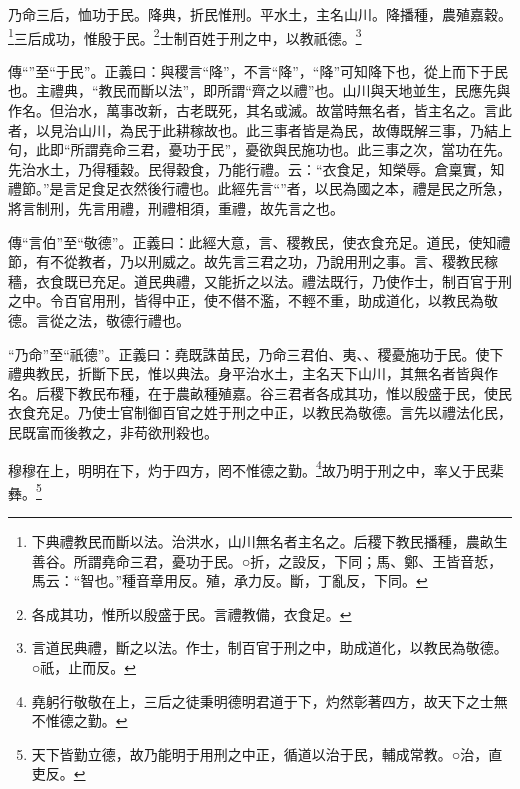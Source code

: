 乃命三后，恤功于民。降典，折民惟刑。平水土，主名山川。降播種，農殖嘉穀。\footnote{下典禮教民而斷以法。治洪水，山川無名者主名之。后稷下教民播種，農畝生善谷。所謂堯命三君，憂功于民。○折，之設反，下同；馬、鄭、王皆音悊，馬云：“智也。”種音章用反。殖，承力反。斷，丁亂反，下同。}三后成功，惟殷于民。\footnote{各成其功，惟所以殷盛于民。言禮教備，衣食足。}士制百姓于刑之中，以教祇德。\footnote{言道民典禮，斷之以法。作士，制百官于刑之中，助成道化，以教民為敬德。○祇，止而反。}


{\noindent\zhuan{}\fzbyks 傳“”至“于民”。正義曰：與稷言“降”，不言“降”，“降”可知降下也，從上而下于民也。主禮典，“教民而斷以法”，即所謂“齊之以禮”也。山川與天地並生，民應先與作名。但治水，萬事改新，古老既死，其名或滅。故當時無名者，皆主名之。言此者，以見治山川，為民于此耕稼故也。此三事者皆是為民，故傳既解三事，乃結上句，此即“所謂堯命三君，憂功于民”，憂欲與民施功也。此三事之次，當功在先。先治水土，乃得種穀。民得穀食，乃能行禮。云：“衣食足，知榮辱。倉稟實，知禮節。”是言足食足衣然後行禮也。此經先言“”者，以民為國之本，禮是民之所急，將言制刑，先言用禮，刑禮相須，重禮，故先言之也。 \par}

{\noindent\zhuan{}\fzbyks 傳“言伯”至“敬德”。正義曰：此經大意，言、稷教民，使衣食充足。道民，使知禮節，有不從教者，乃以刑威之。故先言三君之功，乃說用刑之事。言、稷教民稼穡，衣食既已充足。道民典禮，又能折之以法。禮法既行，乃使作士，制百官于刑之中。令百官用刑，皆得中正，使不僣不濫，不輕不重，助成道化，以教民為敬德。言從之法，敬德行禮也。 \par}

{\noindent\shu{}\fzkt “乃命”至“祇德”。正義曰：堯既誅苗民，乃命三君伯、夷、、稷憂施功于民。使下禮典教民，折斷下民，惟以典法。身平治水土，主名天下山川，其無名者皆與作名。后稷下教民布種，在于農畝種殖嘉。谷三君者各成其功，惟以殷盛于民，使民衣食充足。乃使士官制御百官之姓于刑之中正，以教民為敬德。言先以禮法化民，民既富而後教之，非苟欲刑殺也。 \par}

穆穆在上，明明在下，灼于四方，罔不惟德之勤。\footnote{堯躬行敬敬在上，三后之徒秉明德明君道于下，灼然彰著四方，故天下之士無不惟德之勤。}故乃明于刑之中，率乂于民棐彝。\footnote{天下皆勤立德，故乃能明于用刑之中正，循道以治于民，輔成常教。○治，直吏反。}


